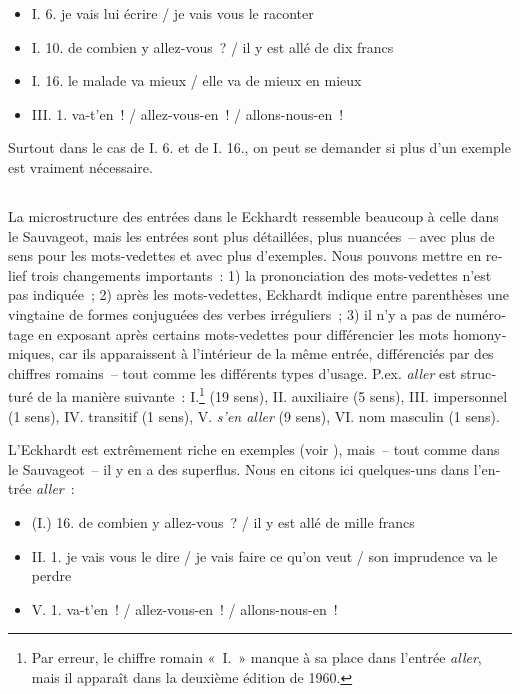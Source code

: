 \documentclass[output=paper,colorlinks,citecolor=brown,arabicfont,chinesefont,booklanguage=french]{langscibook}
\begin{document}
\begin{otherlanguage}{french}
\begin{itemize}
    \item I. 6.	je vais lui écrire / je vais vous le raconter
    \item I. 10. 	de combien y allez-vous~? / il y est allé de dix francs
    \item I. 16. 	le malade va mieux / elle va de mieux en mieux
    \item III. 1.	va-t’en~! / allez-vous-en~! / allons-nous-en~!
\end{itemize}

Surtout dans le cas de I. 6. et de I. 16., on peut se demander si plus d’un exemple est vraiment nécessaire.

\subsection{\citealt{Eckhardt1953} }\label{sec:tillinger:3.7}

La microstructure des entrées dans le Eckhardt ressemble beaucoup à celle dans le Sauvageot, mais les entrées sont plus détaillées, plus nuancées~-- avec plus de sens pour les mots-vedettes et avec plus d’exemples. Nous pouvons mettre en relief trois changements importants~: 1) la prononciation des mots-vedettes n’est pas indiquée~; 2) après les mots-vedettes, Eckhardt indique entre parenthèses une vingtaine de formes conjuguées des verbes irréguliers~; 3) il n’y a pas de numérotage en exposant après certains mots-vedettes pour différencier les mots homonymiques, car ils apparaissent à l’intérieur de la même entrée, différenciés par des chiffres romains~-- tout comme les différents types d’usage. P.ex. \emph{aller} est structuré de la manière suivante~: I.\footnote{Par erreur, le chiffre romain «~I.~» manque à sa place dans l’entrée \emph{aller}, mais il apparaît dans la deuxième édition de 1960.} (19 sens), II. auxiliaire (5 sens), III. impersonnel (1 sens), IV. transitif (1 sens), V. \emph{s’en aller} (9 sens), VI. nom masculin (1 sens).

L’Eckhardt est extrêmement riche en exemples (voir ), mais~-- tout comme dans le Sauvageot~-- il y en a des superflus. Nous en citons ici quelques-uns dans l’entrée \emph{aller}~:

\begin{itemize}
    \item (I.) 16. de combien y allez-vous~? / il y est allé de mille francs
    \item II. 1. je vais vous le dire / je vais faire ce qu’on veut / son imprudence va le perdre
    \item V. 1. va-t’en~! / allez-vous-en~! / allons-nous-en~!
\end{itemize}


\end{otherlanguage}
\end{document}
